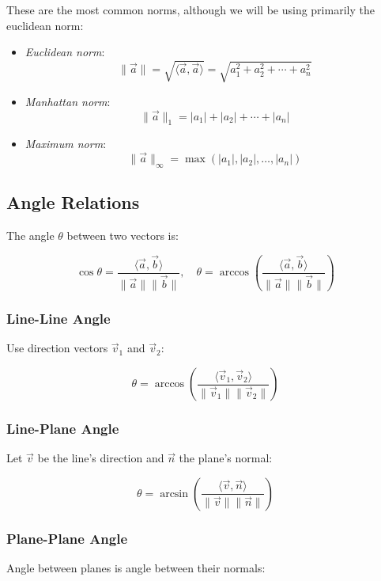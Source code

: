 These are the most common norms, although we will be using primarily the euclidean norm:

\begin{itemize}
	\item \emph{Euclidean norm}:
	      \[
		      \|\vec{a}\| = \sqrt{\langle\vec{a}, \vec{a}\rangle} = \sqrt{a_1^2 + a_2^2 + \cdots + a_n^2}
	      \]
	\item \emph{Manhattan norm}:
	      \[
		      \|\vec{a}\|_1 = |a_1| + |a_2| + \cdots + |a_n|
	      \]
	\item \emph{Maximum norm}:
	      \[
		      \|\vec{a}\|_\infty = \max(|a_1|, |a_2|, \dots , |a_n|)
	      \]
\end{itemize}

\subsection{Angle Relations}

The angle \(\theta\) between two vectors is:

\[
	\cos\theta = \frac{\langle\vec{a}, \vec{b}\rangle}{\|\vec{a}\|\|\vec{b}\|}, \quad \theta = \arccos\left( \frac{\langle\vec{a}, \vec{b}\rangle}{\|\vec{a}\|\|\vec{b}\|} \right)
\]

\subsubsection{Line-Line Angle}

Use direction vectors \(\vec{v}_1\) and \(\vec{v}_2\):

\[
	\theta = \arccos\left( \frac{\langle\vec{v}_1, \vec{v}_2\rangle}{\|\vec{v}_1\|\|\vec{v}_2\|} \right)
\]

\subsubsection{Line-Plane Angle}

Let \(\vec{v}\) be the line's direction and \(\vec{n}\) the plane's normal:

\[
	\theta = \arcsin\left( \frac{\langle\vec{v}, \vec{n}\rangle}{\|\vec{v}\|\|\vec{n}\|} \right)
\]

\subsubsection{Plane-Plane Angle}

Angle between planes is angle between their normals:

